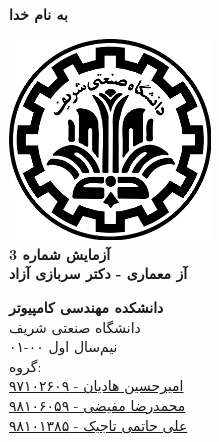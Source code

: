 \documentclass{article}
\begin{document}
\begin{titlepage}
	\begin{center}
		\textbf{ \Huge{به نام خدا}}
	
		\vspace{0.2cm}
		
		\includegraphics[width=0.4\textwidth]{sharif.png}\\
		\vspace{0.2cm}
		\textbf{ \Huge{آزمایش شماره 3}}\\
		\vspace{0.25cm}
		\textbf{ \Large{آز معماری - دکتر سربازی آزاد}}
		\vspace{0.2cm}
		
		
		\large \textbf{دانشکده مهندسی کامپیوتر}\\\vspace{0.1cm}
		\large   دانشگاه صنعتی شریف\\\vspace{0.2cm}
		\large   ﻧﯿﻢ‌سال اول ۰۰-۰۱ \\\vspace{0.10cm}
		\large{گروه:}\\
		\large{\href{mailto:a.h.hadian@gmail.com}{امیرحسین هادیان - ۹۷۱۰۲۶۰۹}}\\
		\large{\href{mailto:mofayezi.m@gmail.com}{محمدرضا مفیضی - ۹۸۱۰۶۰۵۹}}\\
		\large{\href{mailto:a.hatam008@gmail.com}{علی حاتمی تاجیک - ۹۸۱۰۱۳۸۵}}\\
	\end{center}
\end{titlepage}

\newpage

\pagestyle{fancy}
\fancyhf{}
\fancyfoot{}
\setlength{\headheight}{59pt}
\cfoot{\thepage}
\end{document}
